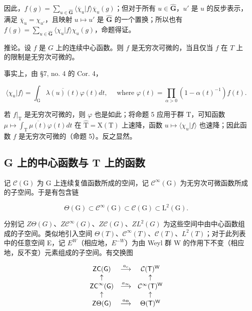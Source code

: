 因此，\(f(g) = \sum_{u\in \hat{\mathbf{G}}}\langle \overline{\chi}_u|f\rangle \overline{\chi}_u(g)\)；但对于所有 \(u\in \hat{\mathbf{G}}\)，\(u'\) 是 \(u\) 的反步表示，满足 \(\overline{\chi}_u = \chi_{u'}\)，且映射 \(u\mapsto u'\) 是 \(\hat{\mathbf{G}}\) 的一个置换；所以也有 \(f(g) = \sum_{u\in \hat{\mathbf{G}}}\langle \chi_u|f\rangle \chi_u(g)\)，命题得证。

推论。设 \(f\) 是 \(G\) 上的连续中心函数。则 \(f\) 是无穷次可微的，当且仅当 \(f\) 在 \(T\) 上的限制是无穷次可微的。

事实上，由 §7, no. 4 的 Cor. 4，

\[
\langle \chi_ {u} | f \rangle = \int_ {\mathrm{G}} \overline {{\lambda (u) (t)}} \varphi (t) d t, \quad \text { where } \varphi (t) = \prod_ {\alpha > 0} (1 - \alpha (t) ^ {- 1}) f (t).
\]

若 \(f|_{\mathrm{T}}\) 是无穷次可微的，则 \(\varphi\) 也是如此；将命题 5 应用于群 \(\mathrm{T}\)，可知函数 \(\mu \mapsto \int_{\mathrm{T}} \overline{\mu(t)} \varphi(t) dt\) 在 \(\hat{\mathrm{T}} = \mathrm{X}(\mathrm{T})\) 上速降，函数 \(u \mapsto \langle \chi_u | f \rangle\) 也速降；因此函数 \(f\) 是无穷次可微的（命题 5）。反之显然。

\subsection{G 上的中心函数与 T 上的函数}

记 \(\mathcal{C}(\mathrm{G})\) 为 G 上连续复值函数所成的空间，记 \(\mathcal{C}^{\infty}(\mathrm{G})\) 为无穷次可微函数所成的子空间。于是有包含链

\[
\Theta (\mathrm{G}) \subset \mathscr {C} ^ {\infty} (\mathrm{G}) \subset \mathscr {C} (\mathrm{G}) \subset \mathrm{L} ^ {2} (\mathrm{G}).
\]

分别记 \(Z\Theta(G)\)、\(Z\mathcal{C}^{\infty}(G)\)、\(Z\mathcal{C}(G)\)、\(ZL^{2}(G)\) 为这些空间中由中心函数组成的子空间。类似地引入空间 \(\Theta(T)\)、\(\mathcal{C}^{\infty}(T)\)、\(\mathcal{C}(T)\)、\(L^{2}(T)\)；对于此列表中的任意空间 E，记 \(E^{W}\)（相应地，\(E^{-W}\)）为由 Weyl 群 W 的作用下不变（相应地，反不变）元素组成的子空间。有交换图

\[
\begin{array}{c c c} \mathsf {Z C} (\mathsf {G}) & \stackrel {{a _ {c}}} {{\longrightarrow}} & \mathcal {C} (\mathsf {T}) ^ {\mathsf {W}} \\ \uparrow & & \uparrow \\ \mathsf {Z C} ^ {\infty} (\mathsf {G}) & \stackrel {{a _ {\infty}}} {{\longrightarrow}} & \mathcal {C} ^ {\infty} (\mathsf {T}) ^ {\mathsf {W}} \\ \uparrow & & \uparrow \\ \mathsf {Z} \Theta (\mathsf {G}) & \stackrel {{a _ {\Theta}}} {{\longrightarrow}} & \Theta (\mathsf {T}) ^ {\mathsf {W}} \end{array}
\]

